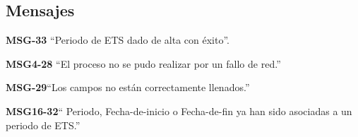 \subsection{Mensajes}

\begin{Citemize}
    \item {\bf MSG-33} ``Periodo de ETS  dado de alta con éxito''.
    \item {\bf MSG4-28}  ``El proceso no se pudo realizar por un fallo de red.''
    \item {\bf MSG-29}{``Los campos no están correctamente llenados.''}
    \item {\bf MSG16-32}{`` Periodo, Fecha-de-inicio o Fecha-de-fin ya han sido asociadas a un periodo de ETS.''}
\end{Citemize}

